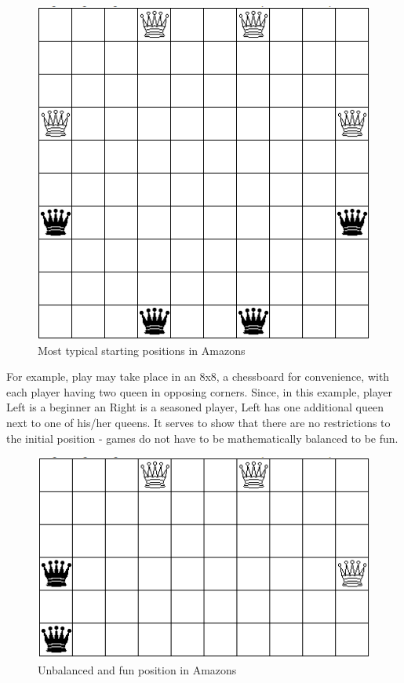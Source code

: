 \begin{figure} [H]
	\begin{center}
		\includegraphics[scale=0.5]{sections/examples/amazons.png}
	\end{center}
\caption{Most typical starting positions in Amazons}
\end{figure}

For example, play may take place in an 8x8, a chessboard for convenience, with each player having two queen in opposing corners. Since, in this example, player Left is a beginner an Right is a seasoned player, Left has one additional queen next to one of his/her queens. It serves to show that there are no restrictions to the initial position - games do not have to be mathematically balanced to be fun.

\begin{figure} [H]
	\begin{center}
		\includegraphics[scale=0.5]{sections/examples/unbalanced_amazons.png}
	\end{center}
	\caption{Unbalanced and fun position in Amazons}
\end{figure}

